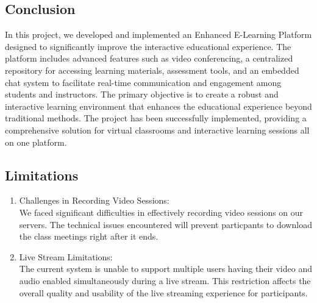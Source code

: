 \documentclass[a4paper,12pt]{article}  %
\begin{document}
\subsection{Conclusion}
In this project, we developed and implemented an Enhanced E-Learning Platform designed to significantly improve the interactive educational experience. The platform includes advanced features such as video conferencing, a centralized repository for accessing learning materials, assessment tools, and an embedded chat system to facilitate real-time communication and engagement among students and instructors. The primary objective is to create a robust and interactive learning environment that enhances the educational experience beyond traditional methods. The project has been successfully implemented, providing a comprehensive solution for virtual classrooms and interactive learning sessions all on one platform.\\

\subsection{Limitations}
\begin{enumerate}
      \item Challenges in Recording Video Sessions:\\
      We faced significant difficulties in effectively recording video sessions on our servers. The technical issues encountered will prevent particpants  to download the class meetings right after it ends.\\

      \item Live Stream Limitations:\\
      The current system is unable to support multiple users having their video and audio enabled simultaneously during a live stream. This restriction affects the overall quality and usability of the live streaming experience for participants.\\
\end{enumerate}
\end{document}
